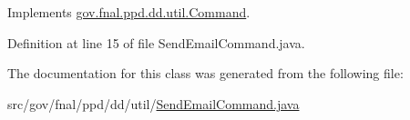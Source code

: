 Implements \hyperlink{interfacegov_1_1fnal_1_1ppd_1_1dd_1_1util_1_1Command_ab87f8aecb39b9d9697d1ccad54603116}{gov.\-fnal.\-ppd.\-dd.\-util.\-Command}.



Definition at line 15 of file Send\-Email\-Command.\-java.



The documentation for this class was generated from the following file\-:\begin{DoxyCompactItemize}
\item 
src/gov/fnal/ppd/dd/util/\hyperlink{SendEmailCommand_8java}{Send\-Email\-Command.\-java}\end{DoxyCompactItemize}
